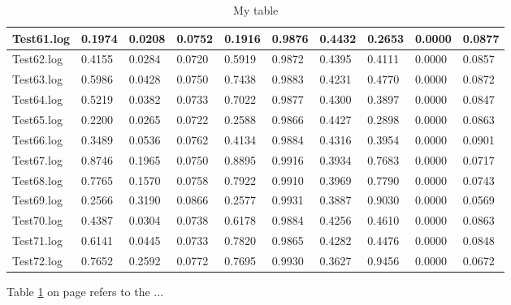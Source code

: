 \begin{table}[]
\begin{tabular}{|l|l|l|l|l|l|l|l|l|l|}
Test61.log & 0.1974 & 0.0208 & 0.0752 & 0.1916 & 0.9876 & 0.4432 & 0.2653 & 0.0000 & 0.0877 \\ \hline
Test62.log & 0.4155 & 0.0284 & 0.0720 & 0.5919 & 0.9872 & 0.4395 & 0.4111 & 0.0000 & 0.0857 \\ \hline
Test63.log & 0.5986 & 0.0428 & 0.0750 & 0.7438 & 0.9883 & 0.4231 & 0.4770 & 0.0000 & 0.0872 \\ \hline
Test64.log & 0.5219 & 0.0382 & 0.0733 & 0.7022 & 0.9877 & 0.4300 & 0.3897 & 0.0000 & 0.0847 \\ \hline
Test65.log & 0.2200 & 0.0265 & 0.0722 & 0.2588 & 0.9866 & 0.4427 & 0.2898 & 0.0000 & 0.0863 \\ \hline
Test66.log & 0.3489 & 0.0536 & 0.0762 & 0.4134 & 0.9884 & 0.4316 & 0.3954 & 0.0000 & 0.0901 \\ \hline
Test67.log & 0.8746 & 0.1965 & 0.0750 & 0.8895 & 0.9916 & 0.3934 & 0.7683 & 0.0000 & 0.0717 \\ \hline
Test68.log & 0.7765 & 0.1570 & 0.0758 & 0.7922 & 0.9910 & 0.3969 & 0.7790 & 0.0000 & 0.0743 \\ \hline
Test69.log & 0.2566 & 0.3190 & 0.0866 & 0.2577 & 0.9931 & 0.3887 & 0.9030 & 0.0000 & 0.0569 \\ \hline
Test70.log & 0.4387 & 0.0304 & 0.0738 & 0.6178 & 0.9884 & 0.4256 & 0.4610 & 0.0000 & 0.0863 \\ \hline
Test71.log & 0.6141 & 0.0445 & 0.0733 & 0.7820 & 0.9865 & 0.4282 & 0.4476 & 0.0000 & 0.0848 \\ \hline
Test72.log & 0.7652 & 0.2592 & 0.0772 & 0.7695 & 0.9930 & 0.3627 & 0.9456 & 0.0000 & 0.0672 \\ \hline

\end{tabular}
\caption{My table}
\label{table:kysymys}
\end{table}

Table \ref{table:kysymys} on page \pageref{table:kysymys} refers to the ...